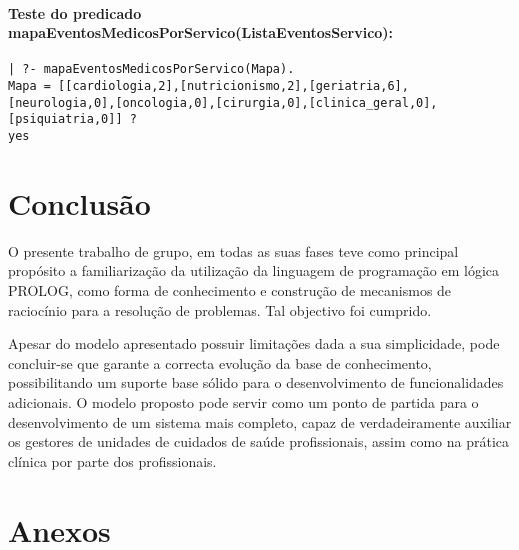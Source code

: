 \documentclass[
  oneside,
  10pt, a4paper,
  footinclude=true,
  headinclude=true,
  cleardoublepage=empty
]{scrbook}
\begin{document}
\subsubsection{Teste do predicado \textbf{mapaEventosMedicosPorServico(ListaEventosServico)}:}

\begin{lstlisting}
| ?- mapaEventosMedicosPorServico(Mapa).
Mapa = [[cardiologia,2],[nutricionismo,2],[geriatria,6],[neurologia,0],[oncologia,0],[cirurgia,0],[clinica_geral,0],[psiquiatria,0]] ? 
yes
\end{lstlisting}




	\chapter{Conclusão}
	
	
	
	O presente trabalho de grupo, em todas as suas fases teve como principal propósito a familiarização da utilização da linguagem de programação em lógica PROLOG, como forma de conhecimento e construção de
mecanismos de raciocínio para a resolução de problemas. Tal objectivo foi cumprido.\par 
		Apesar do modelo apresentado possuir limitações dada a sua simplicidade, pode concluir-se que garante a correcta evolução da base de conhecimento, possibilitando um suporte base sólido para o desenvolvimento de funcionalidades adicionais. 
		O modelo proposto pode servir como um ponto de partida para o
desenvolvimento de um sistema mais completo, capaz de verdadeiramente auxiliar os gestores de unidades de cuidados de saúde profissionais, assim como na prática clínica por parte dos profissionais.
			
	

	

	
	
		\chapter{Anexos}
\end{document}
